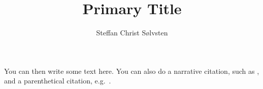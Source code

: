 \documentclass[
    a4paper, %
    stu,     %
    british, %
]{apa7}
\title{Primary Title}
\author{Steffan Christ S{\o}lvsten}
\affiliation{Department of Computer Science, Aarhus University}
\begin{document}
\maketitle
You can then write some text here. You can also do a narrative citation, such as
\textcite{soelvsten2022:TACAS}, and a parenthetical citation, e.g.\
\parencite{soelvsten2022:TACAS}.

\printbibliography
\end{document}
